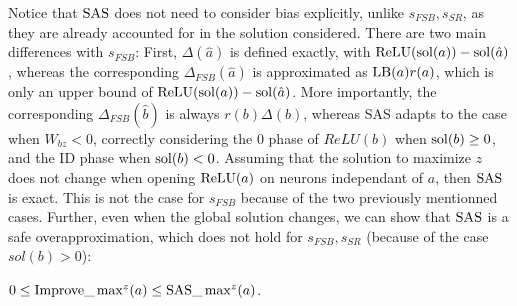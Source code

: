 %	
%	
%	
%	



Notice that $\mathrm{SAS}$ does not need to consider bias explicitly, unlike $s_{FSB},s_{SR}$,
as they are already accounted for in the solution considered. 
There are two main differences with $s_{FSB}$: 
First, $\Delta(\hat{a})$ is defined exactly, with $\mathrm{ReLU}(\mathrm{sol}(a))-\mathrm{sol}(\hat{a})$,
whereas the corresponding $\Delta_{FSB}(\hat{a})$ is approximated as $\mathrm{LB}(a) r(a)$, 
which is only an upper bound of $\mathrm{ReLU}(\mathrm{sol}(a))-\mathrm{sol}(\hat{a})$.
More importantly, the corresponding $\Delta_{FSB}(\hat{b})$ is always $r(b) \Delta(b)$, whereas SAS adapts to the case when $W_{bz}<0$, correctly considering the 0 phase of $ReLU(b)$ when $\mathrm{sol}(b)\geq 0$, and the ID phase when $\mathrm{sol}(b)<0$.
Assuming that the solution to maximize $z$ does not change when opening $\mathrm{ReLU}(a)$
on neurons independant of $a$, then $\mathrm{SAS}$ is exact. This is not the case for $s_{FSB}$ because of the two previously mentionned cases. Further, even when the global solution changes, we can show that $\mathrm{SAS}$ is a safe overapproximation, which does not hold for $s_{FSB},s_{SR}$ (because of the case $sol(b) > 0$):


\begin{proposition}
	\label{prop2}
		$0 \leq \mathrm{Improve}\_\max^z(a) \leq \mathrm{SAS}\_\max^z(a)$. 
\end{proposition}


